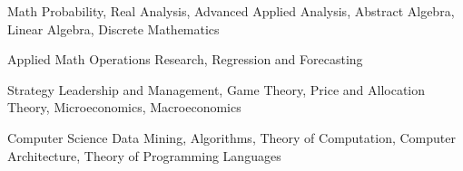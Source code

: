 

\begin{cvskills}

\cvskill
  {Math} %
  {Probability, Real Analysis, Advanced Applied Analysis, Abstract Algebra, Linear Algebra, Discrete Mathematics} %

  \cvskill
    {Applied Math} %
    {Operations Research, Regression and Forecasting} %

\cvskill
  {Strategy} %
  {Leadership and Management, Game Theory, Price and Allocation Theory, Microeconomics, Macroeconomics} %

  \cvskill
    {Computer Science} %
    {Data Mining, Algorithms, Theory of Computation, Computer Architecture, Theory of Programming Languages} %

\end{cvskills}
